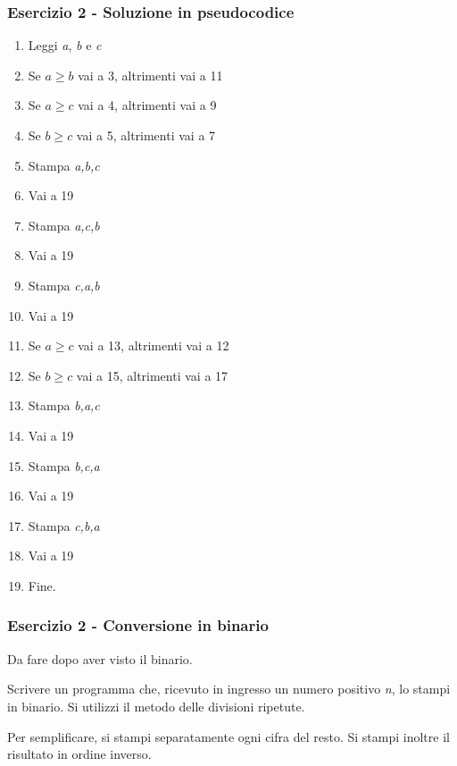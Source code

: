 \documentclass[handout]{beamer}
\begin{document}
\begin{frame}
\frametitle{Esercizio 2 - Soluzione in pseudocodice}
\begin{multicols}{2}
\begin{enumerate}
	\item Leggi \emph{a}, \emph{b} e \emph{c}
	\item Se $a \geq b$ vai a 3, altrimenti vai a 11
	
	\item Se $a \geq c$ vai a 4, altrimenti vai a 9
	\item Se $b \geq c$ vai a 5, altrimenti vai a 7
	\item Stampa \emph{a,b,c}
	\item Vai a 19
	\item Stampa \emph{a,c,b}
	\item Vai a 19
	\item Stampa \emph{c,a,b}
	\item Vai a 19
	
	\item Se $a \geq c$ vai a 13, altrimenti vai a 12
	\item Se $b \geq c$ vai a 15, altrimenti vai a 17
	\item Stampa \emph{b,a,c}
	\item Vai a 19
	\item Stampa \emph{b,c,a}
	\item Vai a 19
	\item Stampa \emph{c,b,a}
	\item Vai a 19
	
	\item Fine.
\end{enumerate}
\end{multicols}
\end{frame}

\fi

\begin{frame}
\frametitle{Esercizio 2 - Conversione in binario}
\alert{Da fare dopo aver visto il binario.}

Scrivere un programma che, ricevuto in ingresso un numero positivo \emph{n}, lo stampi in binario. Si utilizzi il metodo delle divisioni ripetute.

Per semplificare, si stampi separatamente ogni cifra del resto. Si stampi inoltre il risultato in ordine inverso.
\end{frame}
\end{document}
